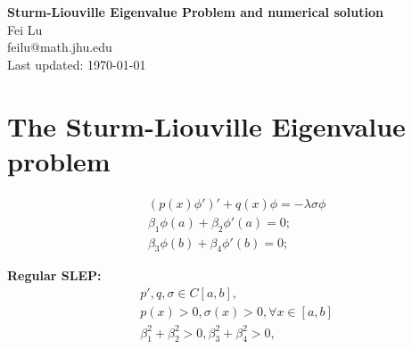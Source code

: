 \documentclass[12pt]{article}
\begin{document}
\begin{center}
\textbf{\Large Sturm-Liouville Eigenvalue Problem and numerical solution} \\[0pt]
\vspace{4mm} Fei Lu\\
 feilu@math.jhu.edu \\
Last updated: \today  
\end{center}
 

\begin{abstract}
Summary: numerical solution to the SLEP by finite difference. 
 \end{abstract}



\section{The Sturm-Liouville Eigenvalue problem}


\begin{align*}
&(p(x)\phi')'  + q(x)\phi = -\lambda \sigma \phi \\
 &  \beta_1\phi(a) + \beta_2\phi'(a) = 0;   \\ %
 &   \beta_3\phi(b) + \beta_4\phi'(b) = 0;   
\end{align*}


\textbf{Regular SLEP:} \vspace{-3mm}
\begin{align*}
& p', q,\sigma  \in C[a,b], \quad\\
& p(x)>0, \sigma(x)>0, \forall x\in [a,b] \\
& \beta_1^2+\beta_2^2 >0, \beta_3^2+\beta_4^2 >0, 
\end{align*}
\end{document}
